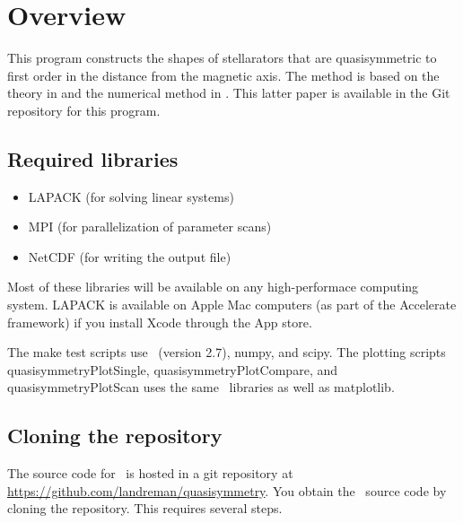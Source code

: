 \chapter{Overview}

This program constructs the shapes of stellarators that are quasisymmetric to first
order in the distance from the magnetic axis.
The method is based on the theory in \cite{GB1,GB2}
and the numerical method in \cite{PaperII}.
This latter paper is available in the Git repository for this program.



\section{Required libraries}

\begin{itemize}

\item {\ttfamily LAPACK} (for solving linear systems)
\item {\ttfamily MPI} (for parallelization of parameter scans)
\item {\ttfamily NetCDF} (for writing the output file)

\end{itemize}

Most of these libraries will be available on any high-performace computing system. {\ttfamily LAPACK}
is available on Apple Mac computers (as part of the Accelerate framework) if you install Xcode through the App store.

The {\ttfamily make test} scripts use \python~(version 2.7),
{\ttfamily numpy}, and {\ttfamily scipy}.
The plotting scripts {\ttfamily quasisymmetryPlotSingle}, {\ttfamily quasisymmetryPlotCompare}, and {\ttfamily quasisymmetryPlotScan} uses the same \python~libraries
as well as {\ttfamily matplotlib}.

\section{Cloning the repository}

The source code for \quasisymmetry~is hosted in a {\ttfamily git} repository at
\url{https://github.com/landreman/quasisymmetry}.
You obtain the \quasisymmetry~source code by cloning the repository. This requires several steps.


